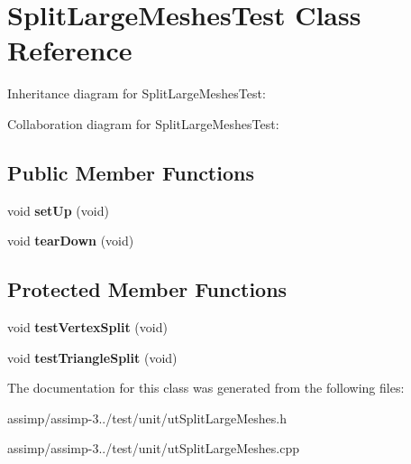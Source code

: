 \hypertarget{class_split_large_meshes_test}{\section{Split\+Large\+Meshes\+Test Class Reference}
\label{class_split_large_meshes_test}
}


Inheritance diagram for Split\+Large\+Meshes\+Test\+:


Collaboration diagram for Split\+Large\+Meshes\+Test\+:
\subsection*{Public Member Functions}
\begin{DoxyCompactItemize}
\item 
\hypertarget{class_split_large_meshes_test_a462c555199b0a9e1404a56803a5ca98a}{void {\bfseries set\+Up} (void)}\label{class_split_large_meshes_test_a462c555199b0a9e1404a56803a5ca98a}

\item 
\hypertarget{class_split_large_meshes_test_a5ab918ffb2c55f520827c47d4580ebb8}{void {\bfseries tear\+Down} (void)}\label{class_split_large_meshes_test_a5ab918ffb2c55f520827c47d4580ebb8}

\end{DoxyCompactItemize}
\subsection*{Protected Member Functions}
\begin{DoxyCompactItemize}
\item 
\hypertarget{class_split_large_meshes_test_a00502979e32e6a9ba071ad3334ee07ff}{void {\bfseries test\+Vertex\+Split} (void)}\label{class_split_large_meshes_test_a00502979e32e6a9ba071ad3334ee07ff}

\item 
\hypertarget{class_split_large_meshes_test_abcc48425874655ca55125f4edc09a88c}{void {\bfseries test\+Triangle\+Split} (void)}\label{class_split_large_meshes_test_abcc48425874655ca55125f4edc09a88c}

\end{DoxyCompactItemize}


The documentation for this class was generated from the following files\+:\begin{DoxyCompactItemize}
\item 
assimp/assimp-\/3../test/unit/ut\+Split\+Large\+Meshes.\+h\item 
assimp/assimp-\/3../test/unit/ut\+Split\+Large\+Meshes.\+cpp\end{DoxyCompactItemize}
